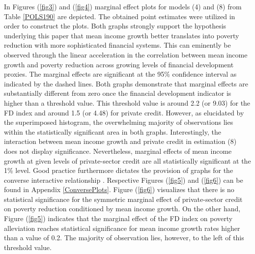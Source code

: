 \documentclass[12pt, a4paper]{article}
\begin{document}
In Figures (\ref{fig3}) and (\ref{fig4}) marginal effect plots for models (4) and (8) from Table \ref{POLS190} are depicted. The obtained point estimates were utilized in order to construct the plots. Both graphs strongly support the hypothesis underlying this paper that mean income growth better translates into poverty reduction with more sophisticated financial systems. This can eminently be observed through the linear acceleration in the correlation between mean income growth and poverty reduction across growing levels of financial development proxies. The marginal effects are significant at the 95\% confidence interval as indicated by the dashed lines. Both graphs demonstrate that marginal effects are substantially different from zero once the financial development indicator is higher than a threshold value. This threshold value is around 2.2 (or 9.03) for the FD index and around 1.5 (or 4.48) for private credit. However, as elucidated by the superimposed histogram, the overwhelming majority of observations lies within the statistically significant area in both graphs. Interestingly, the interaction between mean income growth and private credit in estimation (8) does not display significance. Nevertheless, marginal effects of mean income growth at given levels of private-sector credit are all statistically significant at the 1\% level. Good practice furthermore dictates the provision of graphs for the converse interactive relationship . Respective Figures (\ref{fig5}) and (\ref{fig6}) can be found in Appendix \ref{ConversePlots}. Figure (\ref{fig6}) visualizes that there is no statistical significance for the symmetric marginal effect of private-sector credit on poverty reduction conditioned by mean income growth. On the other hand, Figure (\ref{fig5}) indicates that the marginal effect of the FD index on poverty alleviation reaches statistical significance for mean income growth rates higher than a value of 0.2. The majority of observation lies, however, to the left of this threshold value.
\end{document}
